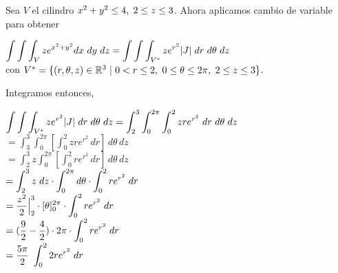 \vspace{15 pt}
Sea $V$ el cilindro $x^2 + y^2 \leq 4, \hspace{3 pt} 2 \leq z \leq 3$. 
Ahora aplicamos cambio de variable para obtener
\begin{center}
$\displaystyle \int\int\int_V ze^{x^2 + y^2} dx \hspace{3 pt} dy \hspace{3 pt} dz = \int\int\int_{V^*} ze^{r^2} |J| \hspace{3 pt} dr \hspace{3 pt} d\theta\hspace{3 pt} dz$ \\
\vspace{10 pt}
con $V^* = \{(r, \theta, z) \in \mathbb{R}^3 \hspace{3 pt} | \hspace{3 pt} 0 < r \leq 2, \hspace{3 pt} 0 \leq \theta \leq 2 \pi, \hspace{3 pt} 2 \leq z \leq 3\}$.
\end{center}
\vspace{15 pt}
Integramos entonces, 
\begin{center}
    $\displaystyle \int\int\int_{V^*} ze^{r^2} |J| \hspace{3 pt} dr \hspace{3 pt} d\theta\hspace{3 pt} dz = \int_2^3\int_0^{2\pi}\int_0^2 zre^{r^2}  \hspace{3 pt} dr \hspace{3 pt} d\theta\hspace{3 pt} dz$\\
    \vspace{10 pt}
    $\displaystyle = \int_3^3 \int_0^{2\pi} \left[ \int_0^2 z r e^{r^2} \, dr \right] \, d\theta \, dz$\\
    \vspace{10 pt}
    $\displaystyle =  \int_2^3 z \int_0^{2\pi}\left[ \int_0^2 r e^{r^2} \, dr \right] \, d\theta \, dz$\\
    \vspace{10 pt}
    $\displaystyle = \int_2^3 z \hspace{3 pt}dz \cdot \int_0^{2\pi} d\theta \cdot \int_0^2 re^{r^2} \hspace{3 pt} dr$\\
    \vspace{10 pt}
    $\displaystyle = \frac{z^2}{2} \Big|_2^3 \cdot [\theta]_0^{2\pi} \cdot \int_0^2 re^{r^2} \hspace{3 pt} dr$\\
    \vspace{10 pt}
    $\displaystyle = (\frac{9}{2} - \frac{4}{2}) \cdot 2\pi \cdot \int _0^2 re^{r^2} \hspace{3 pt} dr$\\
    \vspace{10 pt}
    $\displaystyle = \frac{5\pi}{2} \hspace{3 pt} \int_0^2 2re^{r^2} \hspace{3 pt} dr$
\end{center}
